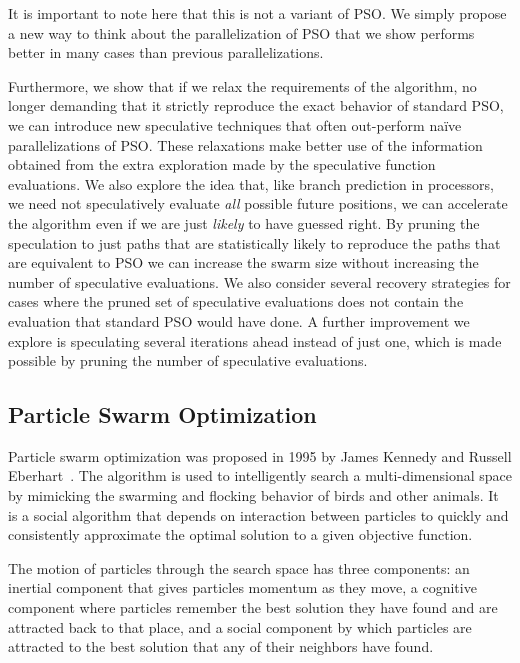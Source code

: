 \documentclass[ms]{byuprop}
\begin{document}
It is important to note here that this is not a variant of PSO.  We simply
propose a new way to think about the parallelization of PSO that we show
performs better in many cases than previous parallelizations.

Furthermore, we show that if we relax the requirements of the algorithm, no
longer demanding that it strictly reproduce the exact behavior of standard PSO,
we can introduce new speculative techniques that often out-perform na\"ive
parallelizations of PSO.  These relaxations make better use of the information
obtained from the extra exploration made by the speculative function
evaluations.  We also explore the idea that, like branch prediction in
processors, we need not speculatively evaluate \emph{all} possible future
positions, we can accelerate the algorithm even if we are just \emph{likely} to
have guessed right.  By pruning the speculation to just paths that are
statistically likely to reproduce the paths that are equivalent to PSO we can
increase the swarm size without increasing the number of speculative
evaluations.  We also consider several recovery strategies for cases where the
pruned set of speculative evaluations does not contain the evaluation that
standard PSO would have done.  A further improvement we explore is speculating
several iterations ahead instead of just one, which is made possible by pruning
the number of speculative evaluations.

\subsection{Particle Swarm Optimization}
\label{sec:pso}

Particle swarm optimization was proposed in 1995 by James Kennedy and Russell
Eberhart~\citep{kennedy-1995-particle-swarm-optimization}.  The algorithm is
used to intelligently search a multi-dimensional space by mimicking the
swarming and flocking behavior of birds and other animals. It is a social
algorithm that depends on interaction between particles to quickly and
consistently approximate the optimal solution to a given objective function.

The motion of particles through the search space has three components: an
inertial component that gives particles momentum as they move, a cognitive
component where particles remember the best solution they have found and are
attracted back to that place, and a social component by which particles are
attracted to the best solution that any of their neighbors have found.
\end{document}
